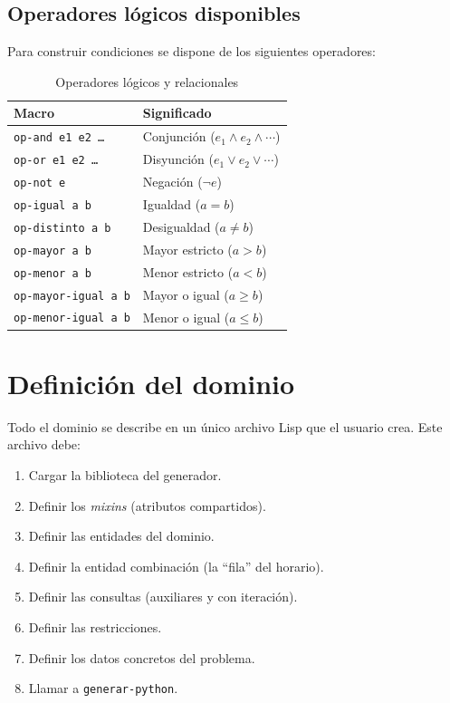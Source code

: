 \documentclass[12pt,a4paper]{article}
\newcommand{\code}[1]{\texttt{#1}}
\begin{document}
\subsection{Operadores lógicos disponibles}

Para construir condiciones se dispone de los siguientes operadores:

\begin{table}[ht]
\centering
\caption{Operadores lógicos y relacionales}
\begin{tabular}{@{}ll@{}}
\toprule
\textbf{Macro} & \textbf{Significado} \\
\midrule
\code{op-and e1 e2 \ldots} & Conjunción ($e_1 \wedge e_2 \wedge \cdots$) \\
\code{op-or  e1 e2 \ldots} & Disyunción ($e_1 \vee e_2 \vee \cdots$) \\
\code{op-not e}            & Negación ($\neg e$) \\
\code{op-igual a b}        & Igualdad ($a = b$) \\
\code{op-distinto a b}     & Desigualdad ($a \neq b$) \\
\code{op-mayor a b}        & Mayor estricto ($a > b$) \\
\code{op-menor a b}        & Menor estricto ($a < b$) \\
\code{op-mayor-igual a b}  & Mayor o igual ($a \geq b$) \\
\code{op-menor-igual a b}  & Menor o igual ($a \leq b$) \\
\bottomrule
\end{tabular}
\end{table}

\section{Definición del dominio}
\label{sec:dominio}

Todo el dominio se describe en un único archivo Lisp que el usuario crea.
Este archivo debe:

\begin{enumerate}
  \item Cargar la biblioteca del generador.
  \item Definir los \textit{mixins} (atributos compartidos).
  \item Definir las entidades del dominio.
  \item Definir la entidad combinación (la ``fila'' del horario).
  \item Definir las consultas (auxiliares y con iteración).
  \item Definir las restricciones.
  \item Definir los datos concretos del problema.
  \item Llamar a \code{generar-python}.
\end{enumerate}
\end{document}
